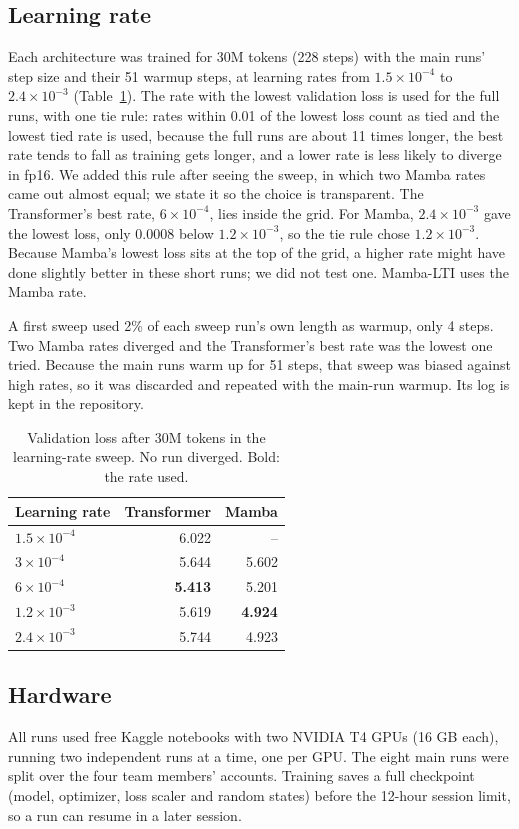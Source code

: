\documentclass[conference]{IEEEtran}
\begin{document}
\subsection{Learning rate}
Each architecture was trained for 30M tokens (228 steps) with the main runs' step size and their
51 warmup steps, at learning rates from $1.5\times10^{-4}$ to $2.4\times10^{-3}$ (Table~\ref{tab:lr}).
The rate with the lowest validation loss is used for the full runs, with one tie rule: rates within
0.01 of the lowest loss count as tied and the lowest tied rate is used, because the full runs are about
11 times longer, the best rate tends to fall as training gets longer, and a lower rate is less likely
to diverge in fp16. We added this rule after seeing the sweep, in which two Mamba rates came out almost
equal; we state it so the choice is transparent. The Transformer's best rate, $6\times10^{-4}$, lies
inside the grid. For Mamba, $2.4\times10^{-3}$ gave the lowest loss, only 0.0008 below
$1.2\times10^{-3}$, so the tie rule chose $1.2\times10^{-3}$. Because Mamba's lowest loss sits at the
top of the grid, a higher rate might have done slightly better in these short runs; we did not test
one. Mamba-LTI uses the Mamba rate.

A first sweep used 2\% of each sweep run's own length as warmup, only 4 steps. Two Mamba rates diverged
and the Transformer's best rate was the lowest one tried. Because the main runs warm up for 51 steps,
that sweep was biased against high rates, so it was discarded and repeated with the main-run warmup.
Its log is kept in the repository.

\begin{table}[t]
\centering
\caption{Validation loss after 30M tokens in the learning-rate sweep. No run diverged. Bold: the rate used.}
\label{tab:lr}
\begin{tabular}{lrr}
\toprule
Learning rate & Transformer & Mamba \\
\midrule
$1.5\times10^{-4}$ & 6.022 & -- \\
$3\times10^{-4}$ & 5.644 & 5.602 \\
$6\times10^{-4}$ & \textbf{5.413} & 5.201 \\
$1.2\times10^{-3}$ & 5.619 & \textbf{4.924} \\
$2.4\times10^{-3}$ & 5.744 & 4.923 \\
\bottomrule
\end{tabular}
\end{table}

\subsection{Hardware}
All runs used free Kaggle notebooks with two NVIDIA T4 GPUs (16 GB each), running two independent runs
at a time, one per GPU. The eight main runs were split over the four team members' accounts. Training
saves a full checkpoint (model, optimizer, loss scaler and random states) before the 12-hour session
limit, so a run can resume in a later session.
\end{document}
